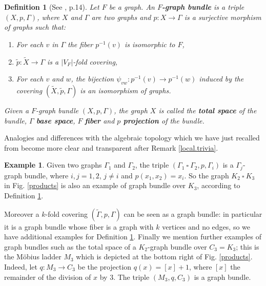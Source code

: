 \documentclass{amsart}
\newtheorem{defn}[theo]{Definition}
\theoremstyle{definition}
\newtheorem{example}[theo]{Example}
\numberwithin{equation}{section}
\begin{document}
\begin{defn}[See \cite{Pisanski}, p.14]\label{graphbundle}
Let $F$ be a graph. An \textbf{$F$-graph bundle} is a triple $(X, p, \Gamma)$, where $X$ and $\Gamma$ are two graphs and $p: X \longrightarrow \Gamma$ is a surjective morphism of graphs such that:
\begin{enumerate}
    \item[{\rm (1).}] For each $v$ in $\Gamma$ the fiber $p^{-1}(v)$ is isomorphic to $F$,
    \item[{\rm (2).}] $\widetilde{p}: \widetilde{X} \longrightarrow \Gamma$ is a $\vert V_F \vert$-fold covering,
    \item[{\rm (3).}] For each $v$ and $w$, the bijection $\psi_{vw}: p^{-1}(v) \longrightarrow p^{-1}(w)$ induced by the covering $(\widetilde{X}, \widetilde{p}, \Gamma)$ is an isomorphism of graphs.
\end{enumerate}
Given a $F$-graph bundle $(X, p, \Gamma)$, the graph $X$ is called the \textbf{total space} of the bundle, $\Gamma$   \textbf{base space}, $F$  \textbf{fiber} and $p$  \textbf{projection} of the bundle. 
\end{defn}
Analogies and differences with the algebraic topology which we have just recalled from \cite{ttd, hofmor, kos} become more clear and transparent after Remark \ref{local.trivia}.

 
\begin{example}\label{exem.bundle}
Given two graphs $\Gamma_1$ and $\Gamma_2$, the triple $(\Gamma_1  \ \square  \ \Gamma_2, p, \Gamma_i)$ is a $\Gamma_j$-graph bundle, where $i,j = 1,2$, $j \neq i$ and $p(x_1, x_2) = x_i$. So the graph $K_2 \ \square  \  K_3$ in Fig. \ref{products} is also an example of graph bundle over $K_3$, according to Definition \ref{graphbundle}.

Moreover  a $k$-fold covering $(\widetilde{\Gamma}, p, \Gamma)$ can be seen as a graph bundle: in particular it is a graph bundle whose fiber is a graph with $k$ vertices and no edges, so we have additional examples for Definition \ref{graphbundle}. Finally we mention further examples of graph bundles such as the total space of a $K_2$-graph bundle over $C_3 = K_3$; this is the M\"obius ladder $M_3$ which is depicted at the bottom right of Fig. \ref{products}. Indeed, let $q : M_3 \longrightarrow C_3$ be the projection $q(x)=[x]+1$, where $[x]$ the remainder of the division of $x$ by $3$. The triple $(M_3, q, C_3)$ is a graph bundle.
\end{example}
\end{document}

